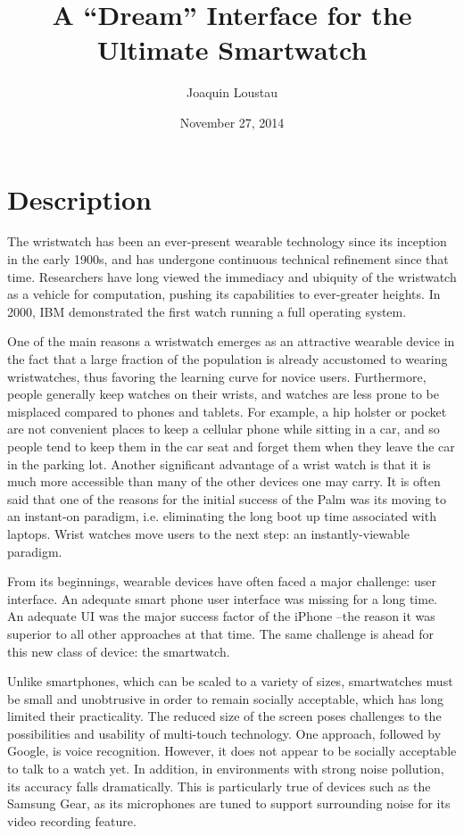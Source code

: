 \documentclass{article}
\title{A ``Dream'' Interface for the Ultimate Smartwatch}
\author{Joaquin Loustau}
\date{November 27, 2014}
\begin{document}
\maketitle

\abstract{
}

\pagebreak
\tableofcontents

\pagebreak

%
%
\section{Description}
The wristwatch has been an ever-present wearable technology since its inception in the early 1900s, and has undergone continuous technical refinement since that time. Researchers have long viewed the immediacy and ubiquity of the wristwatch as a vehicle for computation, pushing its capabilities to ever-greater heights. In 2000, IBM demonstrated the first watch running a full operating system.  

One of the main reasons a wristwatch emerges as an attractive wearable device in the fact that a large fraction of the population is already accustomed to wearing wristwatches, thus favoring the learning curve for novice users. Furthermore, people generally keep watches on their wrists, and watches are less prone to be misplaced compared to phones and tablets. For example, a hip holster or pocket are not convenient places to keep a cellular phone while sitting in a car, and so people tend to keep them in the car seat and forget them when they leave the car in the parking lot. Another significant advantage of a wrist watch is that it is much more accessible than many of the other devices one may carry. It is often said that one of the reasons for the initial success of the Palm was its moving to an instant-on paradigm, i.e. eliminating the long boot up time associated with laptops. Wrist watches move users to the next step: an instantly-viewable paradigm.

From its beginnings, wearable devices have often faced a major challenge: user interface. An adequate smart phone user interface was missing for a long time. An adequate UI was the major success factor of the iPhone --the reason it was superior to all other approaches at that time. The same challenge is ahead for this new class of device: the smartwatch. 

Unlike smartphones, which can be scaled to a variety of sizes, smartwatches must be small and unobtrusive in order to remain socially acceptable, which has long limited their practicality. The reduced size of the screen poses challenges to the possibilities and usability of multi-touch technology. One approach, followed by Google, is voice recognition.  However, it does not appear to be socially acceptable to talk to a watch yet. In addition, in environments with strong noise pollution, its accuracy falls dramatically. This is particularly true of devices such as the Samsung Gear, as its microphones are tuned to support surrounding noise for its video recording feature.
\end{document}
